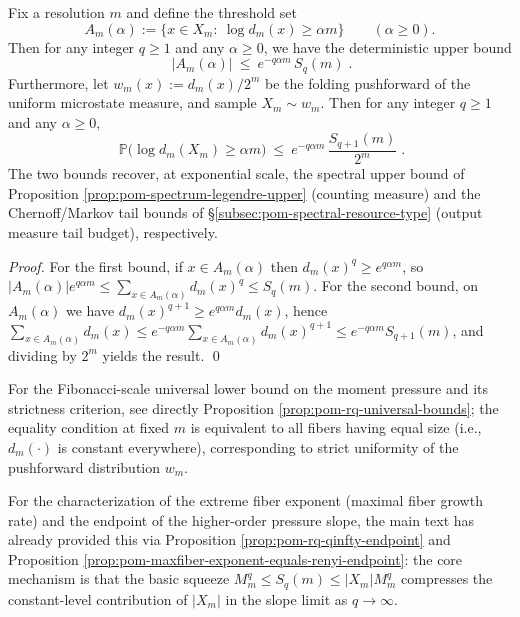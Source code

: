\begin{proposition}\label{prop:pom-chernoff-threshold-bounds}
Fix a resolution \(m\) and define the threshold set
\[
A_m(\alpha):=\{x\in X_m:\ \log d_m(x)\ge \alpha m\}\qquad(\alpha\ge 0).
\]
Then for any integer \(q\ge 1\) and any \(\alpha\ge 0\), we have the deterministic upper bound
\[
\boxed{\;
|A_m(\alpha)|\ \le\ e^{-q\alpha m}\,S_q(m)\; }.
\]
Furthermore, let \(w_m(x):=d_m(x)/2^m\) be the folding pushforward of the uniform microstate measure, and sample \(X_m\sim w_m\).
Then for any integer \(q\ge 1\) and any \(\alpha\ge 0\),
\[
\boxed{\;
\mathbb{P}\bigl(\log d_m(X_m)\ge \alpha m\bigr)
\ \le\ e^{-q\alpha m}\,\frac{S_{q+1}(m)}{2^m}\; }.
\]
The two bounds recover, at exponential scale, the spectral upper bound of Proposition \ref{prop:pom-spectrum-legendre-upper} (counting measure) and the Chernoff/Markov tail bounds of \S\ref{subsec:pom-spectral-resource-type} (output measure tail budget), respectively.
\end{proposition}
\begin{proof}
For the first bound, if \(x\in A_m(\alpha)\) then \(d_m(x)^q\ge e^{q\alpha m}\), so
\(
|A_m(\alpha)|e^{q\alpha m}\le \sum_{x\in A_m(\alpha)}d_m(x)^q\le S_q(m)
\).
For the second bound, on \(A_m(\alpha)\) we have \(d_m(x)^{q+1}\ge e^{q\alpha m}d_m(x)\), hence
\(
\sum_{x\in A_m(\alpha)}d_m(x)\le e^{-q\alpha m}\sum_{x\in A_m(\alpha)}d_m(x)^{q+1}\le e^{-q\alpha m}S_{q+1}(m)
\),
and dividing by \(2^m\) yields the result. \qed
\end{proof}

\begin{remark}\label{rem:pom-fib-baseline-and-endpoint}
For the Fibonacci-scale universal lower bound on the moment pressure and its strictness criterion, see directly Proposition \ref{prop:pom-rq-universal-bounds};
the equality condition at fixed \(m\) is equivalent to all fibers having equal size (i.e., \(d_m(\cdot)\) is constant everywhere), corresponding to strict uniformity of the pushforward distribution \(w_m\).
\par
For the characterization of the extreme fiber exponent (maximal fiber growth rate) and the endpoint of the higher-order pressure slope,
the main text has already provided this via Proposition \ref{prop:pom-rq-qinfty-endpoint} and Proposition \ref{prop:pom-maxfiber-exponent-equals-renyi-endpoint}:
the core mechanism is that the basic squeeze \(M_m^q\le S_q(m)\le |X_m|M_m^q\) compresses the constant-level contribution of \(|X_m|\) in the slope limit as \(q\to\infty\).
\end{remark}

